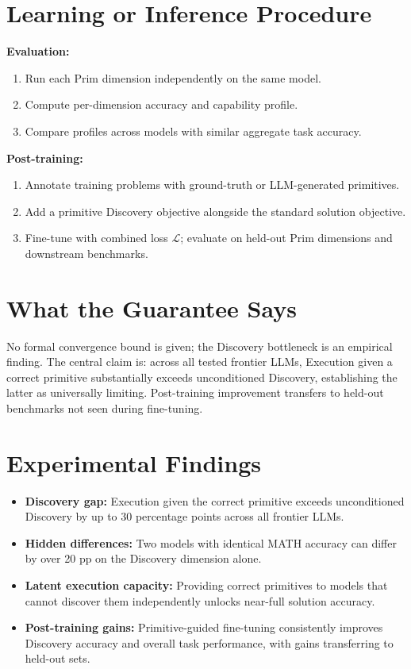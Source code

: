 \documentclass[10pt,twocolumn]{article}
\begin{document}
\section{Learning or Inference Procedure}

\textbf{Evaluation:}
\begin{enumerate}[itemsep=2pt,parsep=0pt]
  \item Run each Prim dimension independently on the same model.
  \item Compute per-dimension accuracy and capability profile.
  \item Compare profiles across models with similar aggregate task accuracy.
\end{enumerate}

\textbf{Post-training:}
\begin{enumerate}[itemsep=2pt,parsep=0pt]
  \item Annotate training problems with ground-truth or LLM-generated primitives.
  \item Add a primitive Discovery objective alongside the standard solution objective.
  \item Fine-tune with combined loss $\mathcal{L}$; evaluate on held-out Prim dimensions
    and downstream benchmarks.
\end{enumerate}

\section{What the Guarantee Says}

No formal convergence bound is given; the Discovery bottleneck is an empirical finding.
The central claim is: across all tested frontier LLMs, Execution given a correct primitive
substantially exceeds unconditioned Discovery, establishing the latter as universally limiting.
Post-training improvement transfers to held-out benchmarks not seen during fine-tuning.

\section{Experimental Findings}

\begin{itemize}[itemsep=2pt,parsep=0pt]
  \item \textbf{Discovery gap:} Execution given the correct primitive exceeds unconditioned
    Discovery by up to 30 percentage points across all frontier LLMs.
  \item \textbf{Hidden differences:} Two models with identical MATH accuracy can differ
    by over 20 pp on the Discovery dimension alone.
  \item \textbf{Latent execution capacity:} Providing correct primitives to models that
    cannot discover them independently unlocks near-full solution accuracy.
  \item \textbf{Post-training gains:} Primitive-guided fine-tuning consistently improves
    Discovery accuracy and overall task performance, with gains transferring to held-out sets.
\end{itemize}
\end{document}
